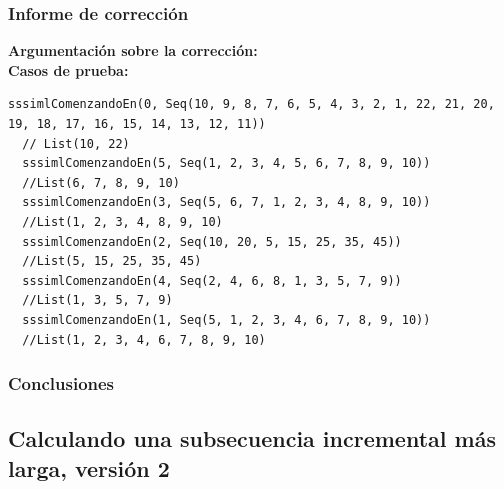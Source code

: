 \documentclass[12pt, a4paper]{article}
\begin{document}
\subsubsection{Informe de corrección}
\textbf{Argumentación sobre la corrección: \\}
\textbf{Casos de prueba: \\}
\begin{lstlisting}[caption=Casos de prueba para la función sssimlComenzandoEn, label=lst:scala_code]
  sssimlComenzandoEn(0, Seq(10, 9, 8, 7, 6, 5, 4, 3, 2, 1, 22, 21, 20, 19, 18, 17, 16, 15, 14, 13, 12, 11))
  // List(10, 22)
  sssimlComenzandoEn(5, Seq(1, 2, 3, 4, 5, 6, 7, 8, 9, 10))
  //List(6, 7, 8, 9, 10)
  sssimlComenzandoEn(3, Seq(5, 6, 7, 1, 2, 3, 4, 8, 9, 10)) 
  //List(1, 2, 3, 4, 8, 9, 10)
  sssimlComenzandoEn(2, Seq(10, 20, 5, 15, 25, 35, 45)) 
  //List(5, 15, 25, 35, 45)
  sssimlComenzandoEn(4, Seq(2, 4, 6, 8, 1, 3, 5, 7, 9))
  //List(1, 3, 5, 7, 9)
  sssimlComenzandoEn(1, Seq(5, 1, 2, 3, 4, 6, 7, 8, 9, 10))
  //List(1, 2, 3, 4, 6, 7, 8, 9, 10)
\end{lstlisting}
\subsubsection{Conclusiones}
\subsection{Calculando una subsecuencia incremental más larga, versión 2}
\end{document}
